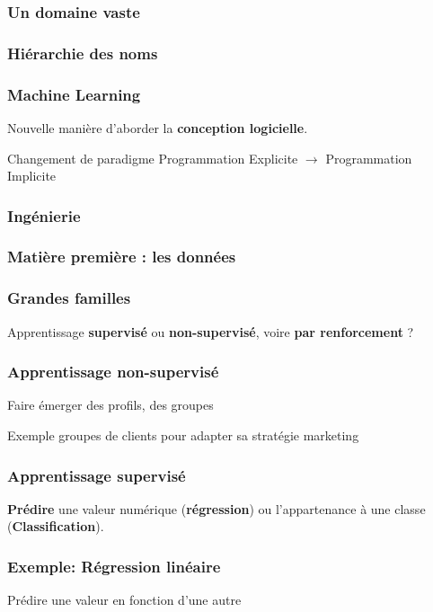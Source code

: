 \begin{frame}
  \frametitle{Un domaine vaste}
\end{frame}

\begin{frame}
  \frametitle{Hiérarchie des noms}
\end{frame}

\begin{frame}
  \frametitle{Machine Learning}
  Nouvelle manière d'aborder la \textbf{conception logicielle}.
  \vfill
  \begin{block}{Changement de paradigme}
  Programmation Explicite $\rightarrow$ Programmation Implicite
  \end{block}
\end{frame}

\begin{frame}
  \frametitle{Ingénierie}
\end{frame}

\begin{frame}
  \frametitle{Matière première : les données}
\end{frame}

\begin{frame}
  \frametitle{Grandes familles}

  Apprentissage \textbf{supervisé} ou \textbf{non-supervisé}, voire \textbf{par renforcement} ?
\end{frame}

\begin{frame}
  \frametitle{Apprentissage non-supervisé}
  Faire émerger des profils, des groupes
  \vfill
  \begin{exampleblock}{Exemple}
  groupes de clients pour adapter sa stratégie marketing
  \end{exampleblock}
\end{frame}

\begin{frame}
  \frametitle{Apprentissage supervisé}
  \textbf{Prédire} une valeur numérique (\textbf{régression}) ou l'appartenance à une classe (\textbf{Classification}).
\end{frame}

\begin{frame}
  \frametitle{Exemple: Régression linéaire}
  Prédire une valeur en fonction d'une autre

\end{frame}

